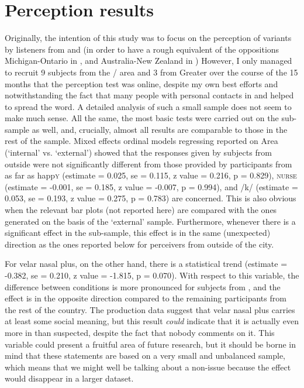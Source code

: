 \chapter{Perception results}
\label{ch.perc_res}

Originally, the intention of this study was to focus on the perception of  variants by listeners from  and  (in order to have a rough equivalent of the oppositions Michigan-Ontario in \citealt{niedzielski1999}, and Australia-New Zealand in \citealt{hayetal2006a})
However, I only managed to recruit 9 subjects from the / area and 3 from Greater  over the course of the 15 months that the perception test was online, despite my own best efforts and notwithstanding the fact that many people with personal contacts in  and  helped to spread the word.
A detailed analysis of such a small sample does not seem to make much sense.
All the same, the most basic tests were carried out on the  sub-sample as well, and, crucially, almost all results are comparable to those in the rest of the sample.
Mixed effects ordinal models regressing reported  on Area (\enquote*{internal} vs. \enquote*{external}) showed that the responses given by subjects from outside were not significantly different from those provided by participants from  as far as happ\textsc{y} (estimate = 0.025, se = 0.115, z value = 0.216, p = 0.829), \textsc{nurse} (estimate = -0.001, se = 0.185, z value = -0.007, p = 0.994), and /k/ (estimate = 0.053, se = 0.193, z value = 0.275, p = 0.783) are concerned.
This is also obvious when the relevant bar plots (not reported here) are compared with the ones generated on the basis of the `external' sample.
Furthermore, whenever there is a significant  effect in the  sub-sample, this effect is in the same (unexpected) direction as the ones reported below for perceivers from outside of the city.

For velar nasal plus, on the other hand, there is a statistical trend (estimate = -0.382, se = 0.210, z value = -1.815, p = 0.070).
With respect to this variable, the difference between  conditions is more pronounced for subjects from , and the effect is in the opposite direction compared to the remaining participants from the rest of the country.
The production data suggest that velar nasal plus carries at least some social meaning, but this result \emph{could} indicate that it is actually even more  in  than suspected, despite the fact that nobody comments on it.
This variable could present a fruitful area of future research, but it should be borne in mind that these statements are based on a very small and unbalanced sample, which means that we might well be talking about a non-issue because the effect would disappear in a larger dataset.

